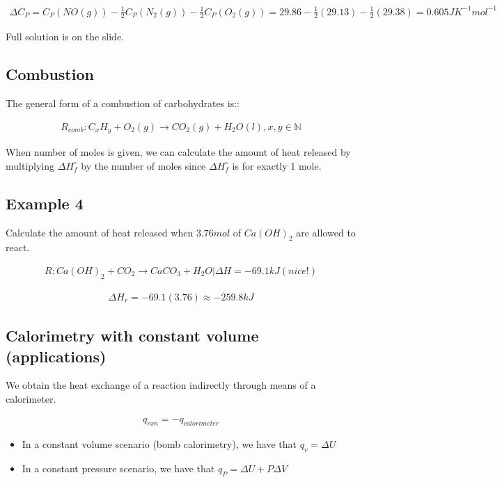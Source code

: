 \documentclass[12pt]{book}
\begin{document}
\begin{align*}
    \Delta C_P=C_P(NO(g))-\frac{1}{2}C_P(N_2(g))-\frac{1}{2}C_P(O_2(g))=29.86-\frac{1}{2}(29.13)-\frac{1}{2}(29.38)=0.605 JK^{-1}mol^{-1}
\end{align*}

Full solution is on the slide.

\subsection*{Combustion}

The general form of a combustion of carbohydrates 
is::

\begin{align*}
    R_{comb}: C_x H_y+O_2(g)\rightarrow CO_2(g)+H_2O(l), x,y\in \mathbb{N}
\end{align*}

When number of moles is given, we can calculate the amount of heat released by multiplying $\Delta H_f^{\circ}$ by the number of moles since $\Delta H_f^{\circ}$ is for exactly 1 mole.

\subsection*{Example 4}
Calculate the amount of heat released when $3.76mol$ of
$Ca(OH)_2$ are allowed to react.

\begin{align*}
    R: Ca(OH)_2+CO_2\rightarrow CaCO_3+H_2O|\Delta H=-69.1 kJ(nice!)
\end{align*}

\begin{align*}
    \Delta H_r=-69.1(3.76)\approx -259.8kJ
\end{align*}

\subsection*{Calorimetry with constant volume (applications)}

We obtain the heat exchange of a reaction indirectly through means of a calorimeter.

\begin{align*}
    q_{rxn}=-q_{calorimeter}
\end{align*}

\begin{itemize}
    \item In a constant volume scenario (bomb calorimetry), we have that $q_v=\Delta U$
    \item In a constant pressure scenario, we have that $q_P=\Delta U+P\Delta V$
\end{itemize}
\end{document}
